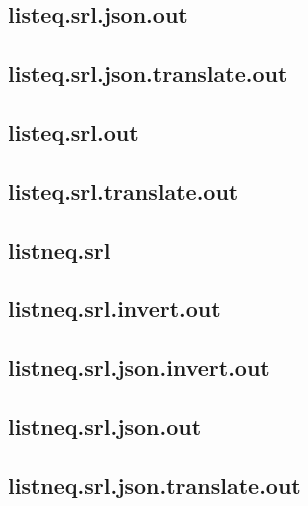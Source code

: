 \subsection{listeq.srl.json.out}
\label{app:listeq_srl.json.out}

\subsection{listeq.srl.json.translate.out}
\label{app:listeq_srl.json.translate.out}

\subsection{listeq.srl.out}
\label{app:listeq_srl.out}

\subsection{listeq.srl.translate.out}
\label{app:listeq_srl.translate.out}

\subsection{listneq.srl}
\label{app:listneq_srl}

\subsection{listneq.srl.invert.out}
\label{app:listneq_srl.invert.out}

\subsection{listneq.srl.json.invert.out}
\label{app:listneq_srl.json.invert.out}

\subsection{listneq.srl.json.out}
\label{app:listneq_srl.json.out}

\subsection{listneq.srl.json.translate.out}
\label{app:listneq_srl.json.translate.out}

